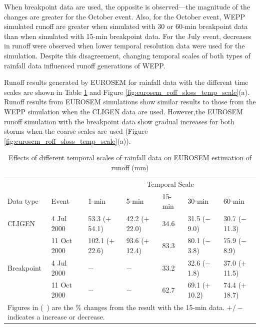 When breakpoint data are used, the opposite is observed---the magnitude of the
changes are greater for the October event. Also, for the October event, WEPP
simulated runoff are greater when simulated with 30 or 60-min breakpoint data
than when simulated with 15-min breakpoint data. For the July event, decreases
in runoff were observed when lower temporal resolution data were used for
the simulation. Despite this disagreement, changing temporal scales of both
types of rainfall data influenced runoff generations of WEPP.

Runoff results generated by EUROSEM for rainfall data with the different time
scales are shown in Table
\ref{tab:DifferentTemporalScalesOfRainfallDataOnEUROSEMRunoffEstimation} and
Figure \ref{fig:eurosem_roff_sloss_temp_scale}(a). Runoff results from EUROSEM
simulations show similar results to those from the WEPP simulation when the
CLIGEN data are used. However,the EUROSEM runoff simulation with the breakpoint
data show gradual increases for both storms when the coarse scales are used
(Figure \ref{fig:eurosem_roff_sloss_temp_scale}(a)).

\begin{table}[htbp]
  \centering
  \footnotesize
  \caption[Effects of different temporal scales of rainfall data on EUROSEM
estimation of runoff]{Effects of different temporal scales of rainfall data on
EUROSEM estimation of runoff (mm)}
\label{tab:DifferentTemporalScalesOfRainfallDataOnEUROSEMRunoffEstimation}
    \begin{tabular}{lllllll}
      \toprule
      & & \multicolumn{5}{c}{Temporal Scale}\\
      \cmidrule{3-7}
      Data type & Event & 1-min & 5-min & 15-min & 30-min & 60-min \\
      \midrule
      CLIGEN & 4 Jul 2000 & 53.3 ($+$54.1) & 42.2 ($+$22.0) & 34.6 & 31.5
($-$9.0) & 30.7 ($-$11.3) \\
       & 11 Oct 2000 & 102.1 ($+$22.6) & 93.6 ($+$12.4) & 83.3 & 80.1 ($-$3.8) &
75.9 ($-$8.9) \\
       \midrule
      Breakpoint & 4 Jul 2000 & $-$ & $-$ & 33.2 & 32.6 ($-$1.8) & 37.0
($+$11.5) \\
       & 11 Oct 2000 & $-$ & $-$ & 62.7 & 69.1 ($+$10.2) & 74.4 ($+$18.7)\\
      \bottomrule
      \multicolumn{7}{p{12cm}}{\footnotesize Figures in (\ ) are the \% changes
from the result with the 15-min data. $+/-$ indicates a increase or decrease.}\\
    \end{tabular}
\end{table}

